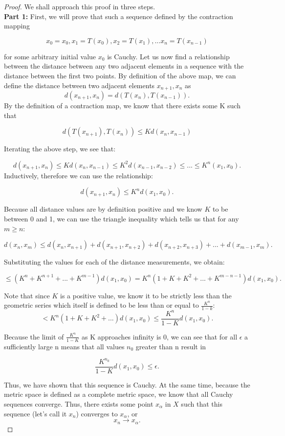 \documentclass{article}
\theoremstyle{remark}
\begin{document}
\begin{proof}
We shall approach this proof in three steps. \\
\textbf{Part 1: }First, we will prove that such a sequence defined by the contraction mapping

$$x_0 = x_0, x_1 = T(x_0), x_2 = T(x_1), ... x_n = T(x_{n-1})$$

for some arbitrary initial value $x_0$ is Cauchy. 
Let us now find a relationship between the distance between any two adjacent elements in a sequence with the distance between the first two points. By definition of the above map, we can define the distance between two adjacent elements $x_{n+1}, x_{n}$ as
$$d(x_{n+1} , x_{n}) = d(T(x_{n}) , T(x_{n-1})).$$
By the definition of a contraction map, we know that there exists some K such that

$$d(T(x_{n+1}) , T(x_{n})) \leq Kd(x_{n}, x_{n-1}) $$

Iterating the above step, we see that:

$$d(x_{n+1} , x_{n}) \leq Kd(x_{n}, x_{n-1}) \leq K^2d(x_{n-1}, x_{n-2}) \leq ... \leq  K^{n}(x_{1}, x_{0}). $$
Inductively, therefore we can use the relationship:

$$d(x_{n+1} , x_{n}) \leq K^{n}d(x_{1}, x_{0}). $$

Because all distance values are by definition positive and we know $K$ to be between 0 and 1, we can use the triangle inequality which tells us that for any $m \geq n$:

$$d(x_{n} , x_{m}) \leq d(x_n, x_{n+1}) + d(x_{n+1}, x_{n+2}) + d(x_{n+2}, x_{n+3}) +  ... + d(x_{m-1}, x_{m}).$$

Substituting the values for each of the distance measurements, we obtain:

$$ \leq (K^n + K^{n+1} + ... + K^{m-1})d(x_1, x_0) = K^n(1+ K + K^2 + ... + K^{m-n-1})d(x_1, x_0).$$

Note that since $K$ is a positive value, we know it to be strictly less than the geometric series which itself is defined to be less than or equal to $\frac{K^n}{1-k}$:
$$ < K^n(1+ K + K^2 + ... )d(x_1, x_0) \leq \frac{K^n}{1-K}d(x_1, x_0).$$

Because the limit of $\frac{K^n}{1-K}$ as K approaches infinity is 0, we can see that for all $\epsilon$ a sufficiently large n means that all values $n_0$ greater than n result in 

$$\frac{K^{n_0}}{1-K}d(x_1, x_0) \leq \epsilon.$$

Thus, we have shown that this sequence is Cauchy. At the same time, because the metric space is defined as a complete metric space, we know that all Cauchy sequences converge. Thus, there exists some point $x_{\alpha}$ in $X$ such that this sequence (let's call it $x_n$) converges to $x_{\alpha}$, or $$x_n \to x_{\alpha}.$$


\end{proof}
\end{document}
